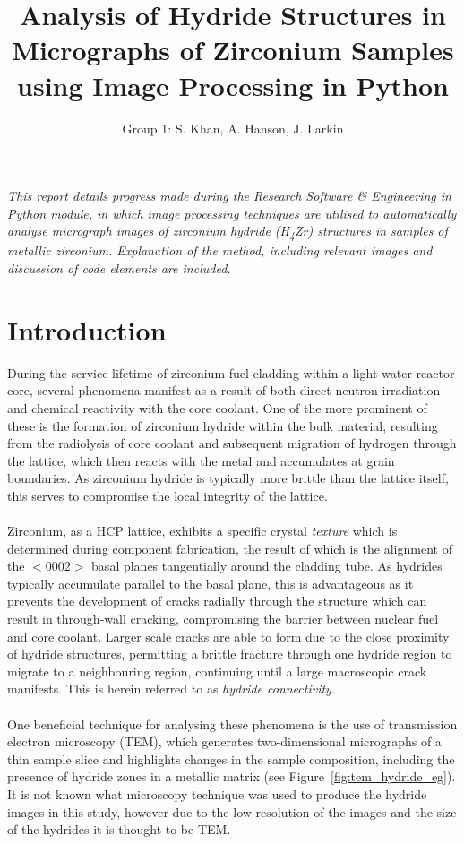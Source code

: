 \documentclass{article}
\title{Analysis of Hydride Structures in Micrographs of Zirconium Samples using Image Processing in Python}
\author{Group 1: S. Khan, A. Hanson, J. Larkin}
\begin{document}
	\maketitle
	
	\begin{center} \textit{This report details progress made during the Research Software \& Engineering in Python module, in which image processing techniques are utilised to automatically analyse micrograph images of zirconium hydride (H\textsubscript{4}Zr) structures in samples of metallic zirconium. Explanation of the method, including relevant images and discussion of code elements are included.} \end{center}
	
	\section{Introduction}
	During the service lifetime of zirconium fuel cladding within a light-water reactor core, several phenomena manifest as a result of both direct neutron irradiation and chemical reactivity with the core coolant. One of the more prominent of these is the formation of zirconium hydride within the bulk material, resulting from the radiolysis of core coolant and subsequent migration of hydrogen through the lattice, which then reacts with the metal and accumulates at grain boundaries. As zirconium hydride is typically more brittle than the lattice itself, this serves to compromise the local integrity of the lattice. 
	\\
	\\
	Zirconium, as a HCP lattice, exhibits a specific crystal \textit{texture} which is determined during component fabrication, the result of which is the alignment of the $<0002>$ basal planes tangentially around the cladding tube. As hydrides typically accumulate parallel to the basal plane, this is advantageous as it prevents the development of cracks radially through the structure which can result in through-wall cracking, compromising the barrier between nuclear fuel and core coolant. Larger scale cracks are able to form due to the close proximity of hydride structures, permitting a brittle fracture through one hydride region to migrate to a neighbouring region, continuing until a large macroscopic crack manifests. This is herein referred to as \textit{hydride connectivity}.
	\\
	\\
	One beneficial technique for analysing these phenomena is the use of transmission electron microscopy (TEM), which generates two-dimensional micrographs of a thin sample slice and highlights changes in the sample composition, including the presence of hydride zones in a metallic matrix (see Figure~\ref{fig:tem_hydride_eg}). It is not known what microscopy technique was used to produce the hydride images in this study, however due to the low resolution of the images and the size of the hydrides it is thought to be TEM.
\end{document}
